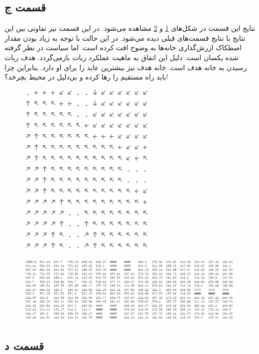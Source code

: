 \documentclass[12pt, a4paper]{article}
\begin{document}
\clearpage

\subsection*{قسمت ج}

نتایج این قسمت در شکل‌های \ref{partc_policy} و \ref{partc_value} مشاهده می‌شود. در این قسمت نیز تفاوتی بین
این نتایج با نتایج قسمت‌های قبلی دیده می‌شود. در این حالت با توجه به زیاد بودن مقدار اصطکاک ازرش‌گذاری خانه‌ها
به وضوح افت کرده است. اما سیاست در نظر گرفته شده یکسان است. دلیل این اتفاق به ماهیت عملکرد ربات بازمی‌گردد.
هدف ربات رسیدن به خانه هدف است. خانه هدف نیز بیشترین عاید را برای او دارد. بنابراین چرا باید راه مستقیم را
رها کرده و بی‌دلیل در محیط بچرخد؟!

\begin{figure}[h]
    \centering
    \includegraphics[scale=0.9]{images/q4/c/policy.png}
    \caption{}
    \label{partc_policy}
\end{figure}

\begin{figure}[h]
    \centering
    \includegraphics[width=0.8\linewidth]{images/q4/c/value.png}
    \caption{}
    \label{partc_value}
\end{figure}

\clearpage

\subsection*{قسمت د}
\end{document}
